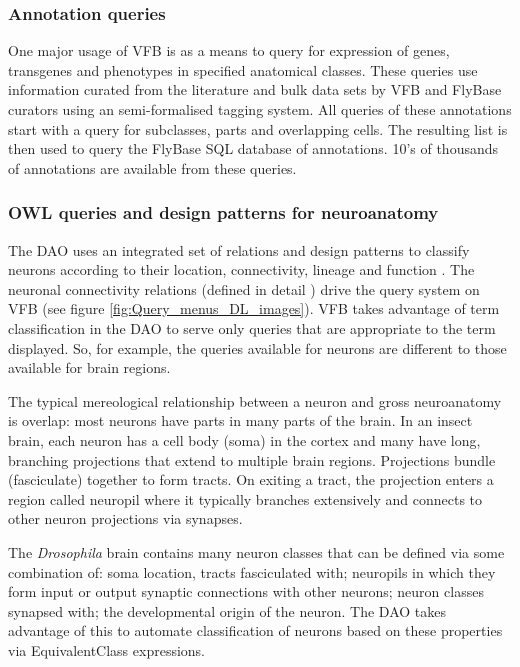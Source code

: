 \documentclass[runningheads,a4paper]{llncs}
\begin{document}
\subsubsection{Annotation queries}

One major usage of VFB is as a means to query for expression of genes,
transgenes and phenotypes in specified anatomical classes.  These
queries use information curated from the literature and bulk data sets
by VFB and FlyBase curators using an semi-formalised tagging
system. All queries of these annotations start with a query for
subclasses, parts and overlapping cells.  The resulting list is then
used to query the FlyBase SQL database of annotations.  10's of
thousands of annotations are available from these queries.


\subsubsection{OWL queries and design patterns for neuroanatomy}

The DAO uses an integrated set of relations and design patterns to
classify neurons according to their location, connectivity, lineage
and function \cite{pmid22180411,pmid22402613}.  The neuronal
connectivity relations (defined in detail \cite{pmid22402613})  drive the query system on VFB (see figure
\ref{fig:Query_menus_DL_images}). VFB takes advantage of term
classification in the DAO to serve only queries that are
appropriate to the term displayed. So, for example, the queries
available for neurons are different to those available for brain regions.

The typical mereological relationship between a neuron and gross
neuroanatomy is overlap:  most neurons have parts in many
parts of the brain.  In an insect brain, each neuron has a cell body
(soma) in the cortex and many have long, branching projections that extend
to multiple brain regions.  Projections bundle (fasciculate)
together to form tracts.  On exiting a tract, the projection enters a
region called neuropil where it typically branches extensively and
connects to other neuron projections via synapses.

The \textit{Drosophila} brain contains many neuron classes that can be
defined via some combination of: soma location, tracts fasciculated
with; neuropils in which they form input or output synaptic
connections with other neurons; neuron classes synapsed with; the
developmental origin of the neuron.  The DAO takes advantage of this
to automate classification of neurons based on these properties via
EquivalentClass expressions.
\end{document}

